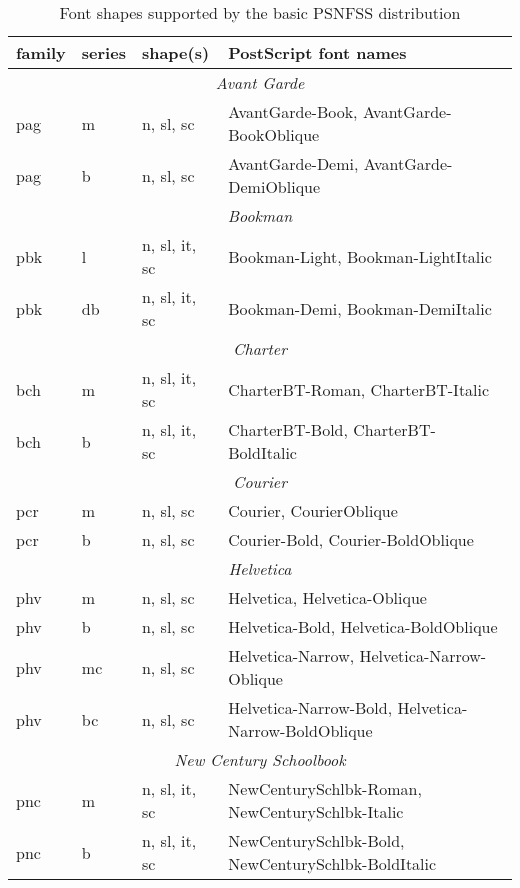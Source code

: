 \documentclass[11pt]{ltxguide}[1995/11/28]
\newcommand{\ps}{PostScript}
\begin{document}
\begin{table}[p]
  \caption{Font shapes supported by the basic PSNFSS distribution}
  \label{tab:families}
  \medskip
  
  {\small
  \begin{tabularx}{\linewidth}{|l|l|l|>{\raggedright\arraybackslash}X|}
  \hline
  \textbf{family} & \textbf{series} & \textbf{shape(s)} & \textbf{\ps{} font names}\\
  \hline\hline
  \multicolumn{4}{|c|}{\textit{Avant Garde}}\\ \hline
   pag & m & n, sl, sc & AvantGarde-Book, AvantGarde-BookOblique\\ \hline
   pag & b & n, sl, sc & AvantGarde-Demi, AvantGarde-DemiOblique\\ \hline \hline
  \multicolumn{4}{|c|}{\textit{Bookman}}\\ \hline
   pbk & l & n, sl, it, sc & Bookman-Light, Bookman-LightItalic\\ \hline
   pbk & db & n, sl, it, sc & Bookman-Demi, Bookman-DemiItalic\\ \hline \hline
  \multicolumn{4}{|c|}{\textit{Charter}}\\ \hline
   bch & m & n, sl, it, sc & CharterBT-Roman, CharterBT-Italic\\ \hline
   bch & b & n, sl, it, sc & CharterBT-Bold, CharterBT-BoldItalic\\ \hline \hline
  \multicolumn{4}{|c|}{\textit{Courier}}\\ \hline
   pcr & m & n, sl, sc & Courier, CourierOblique\\ \hline
   pcr & b & n, sl, sc & Courier-Bold, Courier-BoldOblique\\ \hline \hline
  \multicolumn{4}{|c|}{\textit{Helvetica}}\\ \hline
   phv & m & n, sl, sc & Helvetica, Helvetica-Oblique\\ \hline
   phv & b & n, sl, sc & Helvetica-Bold, Helvetica-BoldOblique\\ \hline
   phv & mc & n, sl, sc & Helvetica-Narrow, Helvetica-Narrow-Oblique\\ \hline
   phv & bc & n, sl, sc & Helvetica-Narrow-Bold, Helvetica-Narrow-BoldOblique\\\hline \hline
  \multicolumn{4}{|c|}{\textit{New Century Schoolbook}}\\ \hline
   pnc & m & n, sl, it, sc & NewCenturySchlbk-Roman, NewCenturySchlbk-Italic\\ \hline
   pnc & b & n, sl, it, sc & NewCenturySchlbk-Bold, NewCenturySchlbk-BoldItalic\\ \hline \hline

\end{tabularx}}
\end{table}
\end{document}
